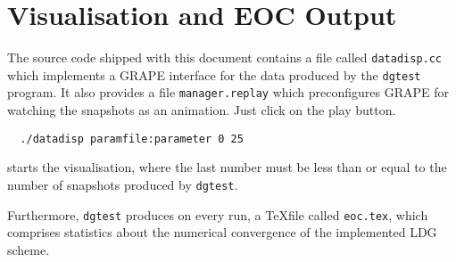 \section{Visualisation and EOC Output} \label{se:outputvisualisation}

The source code shipped with this document contains a file called
\lstinline!datadisp.cc! which implements a GRAPE interface for the data
produced by the \lstinline!dgtest! program. It also provides a file
\lstinline!manager.replay! which preconfigures GRAPE for watching the snapshots
as an animation. Just click on the play button.
%
\begin{lstlisting} 
  ./datadisp paramfile:parameter 0 25 
\end{lstlisting}
%
starts the visualisation, where the last number must be less than or equal to
the number of snapshots produced by \lstinline!dgtest!.

Furthermore, \lstinline!dgtest! produces on every run, a \TeX file called
\lstinline!eoc.tex!, which comprises statistics about the numerical convergence
of the implemented LDG scheme.

